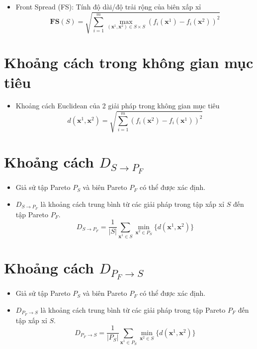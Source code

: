 \documentclass{book}
\begin{document}
\begin{itemize}
    \item Front Spread (FS): Tính độ dài/độ trải rộng của biên xấp xỉ
    \[ \mathbf{FS}(S) = \sqrt{\sum_{i=1}^m \max_{(\mathbf{x}^1, \mathbf{x}^2) \in S \times S} (f_i(\mathbf{x}^1) - f_i(\mathbf{x}^2))^2} \]
\end{itemize}

\section*{Khoảng cách trong không gian mục tiêu}

\begin{itemize}
    \item Khoảng cách Euclidean của 2 giải pháp trong không gian mục tiêu
    \[ d(\mathbf{x}^1, \mathbf{x}^2) = \sqrt{\sum_{i=1}^m (f_i(\mathbf{x}^2) - f_i(\mathbf{x}^1))^2} \]
\end{itemize}

\section*{Khoảng cách $D_{S \rightarrow P_F}$}

\begin{itemize}
    \item Giả sử tập Pareto $P_S$ và biên Pareto $P_F$ có thể được xác định.
    \item $D_{S \rightarrow P_F}$ là khoảng cách trung bình từ các giải pháp trong tập xấp xỉ $S$ đến tập Pareto $P_F$.
    \[ D_{S \rightarrow P_F} = \frac{1}{|S|} \sum_{\mathbf{x}^1 \in S} \min_{\mathbf{x}^2 \in P_S} \{d(\mathbf{x}^1, \mathbf{x}^2)\} \]
\end{itemize}

\section*{Khoảng cách $D_{P_F \rightarrow S}$}

\begin{itemize}
    \item Giả sử tập Pareto $P_S$ và biên Pareto $P_F$ có thể được xác định.
    \item $D_{P_F \rightarrow S}$ là khoảng cách trung bình từ các giải pháp trong tập Pareto $P_F$ đến tập xấp xỉ $S$.
    \[ D_{P_F \rightarrow S} = \frac{1}{|P_S|} \sum_{\mathbf{x}^1 \in P_S} \min_{\mathbf{x}^2 \in S} \{d(\mathbf{x}^1, \mathbf{x}^2)\} \]
\end{itemize}
\end{document}
